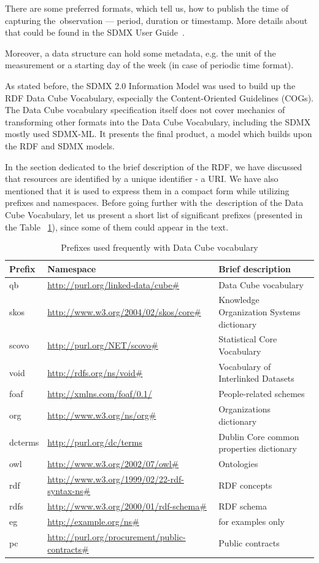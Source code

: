 There are some preferred formats, which tell us, how to publish the time of capturing
the~observation --- period, duration or timestamp. More details about that could be found
in the SDMX User Guide~\cite{sdmxuserguide}.

Moreover, a data structure can hold some metadata, e.g. the unit of the measurement
or a starting day of the week (in case of periodic time format).

As stated before, the SDMX 2.0 Information Model was used to build up the
RDF Data Cube Vocabulary, especially the Content-Oriented Guidelines (COGs). The Data Cube
vocabulary specification itself does not cover mechanics of transforming other formats
into the Data Cube Vocabulary, including the SDMX mostly used SDMX-ML. It presents the final
product, a model which builds upon the RDF and SDMX models.

In the section dedicated to the brief description of the RDF, we have discussed that resources
are identified by a unique identifier - a URI. We have also mentioned that it is used to express
them in a compact form while utilizing prefixes and namespaces. Before going further with
the~description of the Data Cube Vocabulary, let us present a short list of significant prefixes
(presented in the Table ~\ref{tab:sdmxprefixes}),
since some of them could appear in the text.

\begin{table}[h]\footnotesize
  \caption{Prefixes used frequently with Data Cube vocabulary}
  \label{tab:sdmxprefixes}
\scriptsize\begin{tabular}{l l l}
Prefix & Namespace & Brief description \\
\hline
qb & \url{http://purl.org/linked-data/cube#} & Data Cube vocabulary \\
skos & \url{http://www.w3.org/2004/02/skos/core#} & Knowledge Organization Systems dictionary \\
scovo & \url{http://purl.org/NET/scovo#} & Statistical Core Vocabulary \\
void & \url{http://rdfs.org/ns/void#} & Vocabulary of Interlinked Datasets \\
foaf & \url{http://xmlns.com/foaf/0.1/} & People-related schemes \\
org & \url{http://www.w3.org/ns/org#} & Organizations dictionary \\
dcterms & \url{http://purl.org/dc/terms} & Dublin Core common properties dictionary \\
owl & \url{http://www.w3.org/2002/07/owl#} & Ontologies \\
rdf & \url{http://www.w3.org/1999/02/22-rdf-syntax-ns#} & RDF concepts \\
rdfs & \url{http://www.w3.org/2000/01/rdf-schema#} & RDF schema \\
eg & \url{http://example.org/ns#} & for examples only \\
pc & \url{http://purl.org/procurement/public-contracts#} & Public contracts \\
\end{tabular}\end{table}

